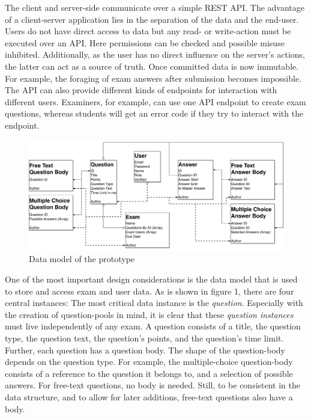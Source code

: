 The client and server-side communicate over a simple REST API. The
advantage of a client-server application lies in the separation of the
data and the end-user. Users do not have direct access to data but any
read- or write-action must be executed over an API. Here permissions can
be checked and possible misuse inhibited. Additionally, as the user has
no direct influence on the server's actions, the latter can act as a
source of truth. Once committed data is now immutable. For example, the
foraging of exam answers after submission becomes impossible. The API
can also provide different kinds of endpoints for interaction with
different users. Examiners, for example, can use one API endpoint to
create exam questions, whereas students will get an error code if they
try to interact with the endpoint.

\begin{figure}
\centering
\includegraphics{../figures/dataModel.svg}
\caption{Data model of the prototype}
\end{figure}

One of the most important design considerations is the data model that
is used to store and access exam and user data. As is shown in figure 1,
there are four central instances: The most critical data instance is the
\emph{question}. Especially with the creation of question-pools in mind,
it is clear that these \emph{question instances} must live independently
of any exam. A question consists of a title, the question type, the
question text, the question's points, and the question's time limit.
Further, each question has a question body. The shape of the
question-body depends on the question type. For example, the
multiple-choice question-body consists of a reference to the question it
belongs to, and a selection of possible answers. For free-text
questions, no body is needed. Still, to be consistent in the data
structure, and to allow for later additions, free-text questions also
have a body.

